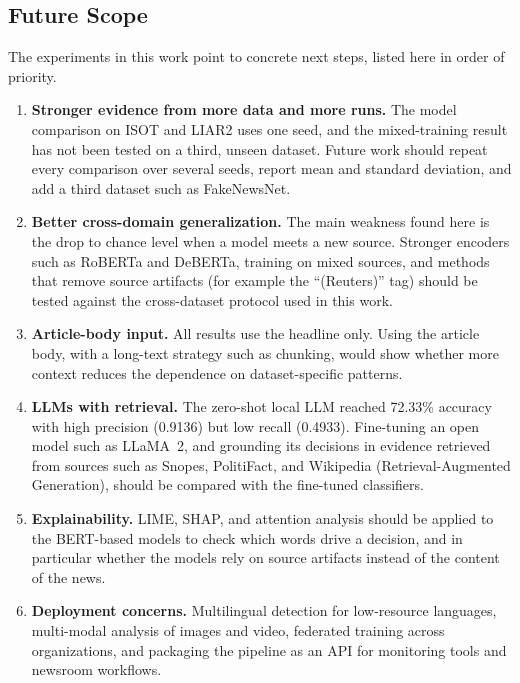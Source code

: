 \documentclass[runningheads]{llncs}
\begin{document}
\subsection{Future Scope}

The experiments in this work point to concrete next steps, listed here in order of priority.

\begin{enumerate}
\item \textbf{Stronger evidence from more data and more runs.} The model comparison on ISOT and LIAR2 uses one seed, and the mixed-training result has not been tested on a third, unseen dataset. Future work should repeat every comparison over several seeds, report mean and standard deviation, and add a third dataset such as FakeNewsNet.
\item \textbf{Better cross-domain generalization.} The main weakness found here is the drop to chance level when a model meets a new source. Stronger encoders such as RoBERTa and DeBERTa, training on mixed sources, and methods that remove source artifacts (for example the ``(Reuters)'' tag) should be tested against the cross-dataset protocol used in this work.
\item \textbf{Article-body input.} All results use the headline only. Using the article body, with a long-text strategy such as chunking, would show whether more context reduces the dependence on dataset-specific patterns.
\item \textbf{LLMs with retrieval.} The zero-shot local LLM reached 72.33\% accuracy with high precision (0.9136) but low recall (0.4933). Fine-tuning an open model such as LLaMA~2, and grounding its decisions in evidence retrieved from sources such as Snopes, PolitiFact, and Wikipedia (Retrieval-Augmented Generation), should be compared with the fine-tuned classifiers.
\item \textbf{Explainability.} LIME, SHAP, and attention analysis should be applied to the BERT-based models to check which words drive a decision, and in particular whether the models rely on source artifacts instead of the content of the news.
\item \textbf{Deployment concerns.} Multilingual detection for low-resource languages, multi-modal analysis of images and video, federated training across organizations, and packaging the pipeline as an API for monitoring tools and newsroom workflows.
\end{enumerate}



\end{document}

